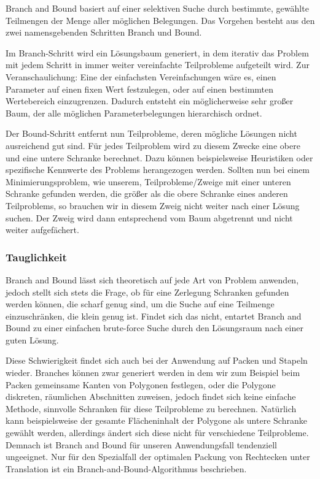 \documentclass[runningheads,a4paper]{llncs}
\begin{document}
Branch and Bound basiert auf einer selektiven Suche durch bestimmte, gewählte Teilmengen der Menge aller möglichen Belegungen. Das Vorgehen besteht aus den zwei namensgebenden Schritten Branch und Bound.

Im Branch-Schritt wird ein Lösungsbaum generiert, in dem iterativ das Problem mit jedem Schritt in immer weiter vereinfachte Teilprobleme aufgeteilt wird. Zur Veranschaulichung: Eine der einfachsten Vereinfachungen wäre es, einen Parameter auf einen fixen Wert festzulegen, oder auf einen bestimmten Wertebereich einzugrenzen. 
Dadurch entsteht ein möglicherweise sehr großer Baum, der alle möglichen Parameterbelegungen hierarchisch ordnet.

Der Bound-Schritt entfernt nun Teilprobleme, deren mögliche Lösungen nicht ausreichend gut sind. Für jedes Teilproblem wird zu diesem Zwecke eine obere und eine untere Schranke berechnet. Dazu können beispielsweise Heuristiken oder spezifische Kennwerte des Problems herangezogen werden.
Sollten nun bei einem Minimierungsproblem, wie unserem, Teilprobleme/Zweige mit einer unteren Schranke gefunden werden, die größer als die obere Schranke eines anderen Teilproblems, so brauchen wir in diesem Zweig nicht weiter nach einer Lösung suchen. Der Zweig wird dann entsprechend vom Baum abgetrennt und nicht weiter aufgefächert.

\subsubsection{Tauglichkeit}

Branch and Bound lässt sich theoretisch auf jede Art von Problem anwenden, jedoch stellt sich stets die Frage, ob für eine Zerlegung Schranken gefunden werden können, die scharf genug sind, um die Suche auf eine Teilmenge einzuschränken, die klein genug ist. 
Findet sich das nicht, entartet Branch and Bound zu einer einfachen brute-force Suche durch den Lösungsraum nach einer guten Lösung.

Diese Schwierigkeit findet sich auch bei der Anwendung auf Packen und Stapeln wieder. Branches können zwar generiert werden in dem wir zum Beispiel beim Packen gemeinsame Kanten von Polygonen festlegen, oder die Polygone diskreten, räumlichen Abschnitten zuweisen, jedoch findet sich keine einfache Methode, sinnvolle Schranken für diese Teilprobleme zu berechnen. Natürlich kann beispielsweise der gesamte Flächeninhalt der Polygone als untere Schranke gewählt werden, allerdings ändert sich diese nicht für verschiedene Teilprobleme. Demnach ist Branch and Bound für unseren Anwendungsfall tendenziell ungeeignet. Nur für den Spezialfall der optimalen Packung von Rechtecken unter Translation ist ein Branch-and-Bound-Algorithmus beschrieben. \cite{scheithauer2008zuschnitt}
\end{document}
